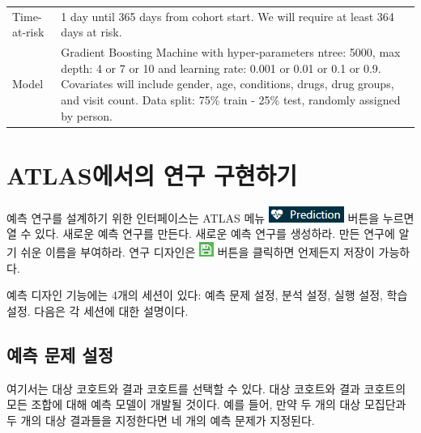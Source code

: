 \documentclass[10.5pt]{book}
\theoremstyle{definition}
\theoremstyle{definition}
\theoremstyle{definition}
\theoremstyle{remark}
\begin{document}
\begin{longtable}[]{@{}ll@{}}
\begin{minipage}[t]{0.23\columnwidth}
Time-at-risk\strut
\end{minipage} & \begin{minipage}[t]{0.71\columnwidth}\raggedright\strut
1 day until 365 days from cohort start. We will require at least 364
days at risk.\strut
\end{minipage}\tabularnewline
\begin{minipage}[t]{0.23\columnwidth}\raggedright\strut
Model\strut
\end{minipage} & \begin{minipage}[t]{0.71\columnwidth}\raggedright\strut
Gradient Boosting Machine with hyper-parameters ntree: 5000, max depth:
4 or 7 or 10 and learning rate: 0.001 or 0.01 or 0.1 or 0.9. Covariates
will include gender, age, conditions, drugs, drug groups, and visit
count. Data split: 75\% train - 25\% test, randomly assigned by
person.\strut
\end{minipage}\tabularnewline
\bottomrule
\end{longtable}

\section{ATLAS에서의 연구 구현하기}\label{atlas--}

예측 연구를 설계하기 위한 인터페이스는 ATLAS 메뉴
\includegraphics{images/PatientLevelPrediction/predictionButton.png}
버튼을 누르면 열 수 있다. 새로운 예측 연구를 만든다. 새로운 예측 연구를
생성하라. 만든 연구에 알기 쉬운 이름을 부여하라. 연구 디자인은
\includegraphics{images/PopulationLevelEstimation/save.png} 버튼을
클릭하면 언제든지 저장이 가능하다. 

예측 디자인 기능에는 4개의 세션이 있다: 예측 문제 설정, 분석 설정, 실행
설정, 학습 설정. 다음은 각 세션에 대한 설명이다.

\subsection{예측 문제 설정}\label{--}

여기서는 대상 코호트와 결과 코호트를 선택할 수 있다. 대상 코호트와 결과
코호트의 모든 조합에 대해 예측 모델이 개발될 것이다. 예를 들어, 만약 두
개의 대상 모집단과 두 개의 대상 결과들을 지정한다면 네 개의 예측 문제가
지정된다.
\end{document}
